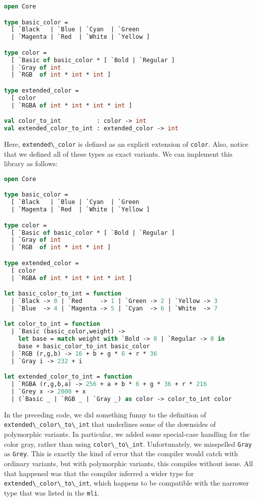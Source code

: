 \begin{lstlisting}[language=Caml]
open Core

type basic_color =
  [ `Black   | `Blue | `Cyan  | `Green
  | `Magenta | `Red  | `White | `Yellow ]

type color =
  [ `Basic of basic_color * [ `Bold | `Regular ]
  | `Gray of int
  | `RGB  of int * int * int ]

type extended_color =
  [ color
  | `RGBA of int * int * int * int ]

val color_to_int          : color -> int
val extended_color_to_int : extended_color -> int
\end{lstlisting}

Here, \passthrough{\lstinline!extended\_color!} is defined as an
explicit extension of \passthrough{\lstinline!color!}. Also, notice that
we defined all of these types as exact variants. We can implement this
library as follows:

\begin{lstlisting}[language=Caml]
open Core

type basic_color =
  [ `Black   | `Blue | `Cyan  | `Green
  | `Magenta | `Red  | `White | `Yellow ]

type color =
  [ `Basic of basic_color * [ `Bold | `Regular ]
  | `Gray of int
  | `RGB  of int * int * int ]

type extended_color =
  [ color
  | `RGBA of int * int * int * int ]

let basic_color_to_int = function
  | `Black -> 0 | `Red     -> 1 | `Green -> 2 | `Yellow -> 3
  | `Blue  -> 4 | `Magenta -> 5 | `Cyan  -> 6 | `White  -> 7

let color_to_int = function
  | `Basic (basic_color,weight) ->
    let base = match weight with `Bold -> 8 | `Regular -> 0 in
    base + basic_color_to_int basic_color
  | `RGB (r,g,b) -> 16 + b + g * 6 + r * 36
  | `Gray i -> 232 + i

let extended_color_to_int = function
  | `RGBA (r,g,b,a) -> 256 + a + b * 6 + g * 36 + r * 216
  | `Grey x -> 2000 + x
  | (`Basic _ | `RGB _ | `Gray _) as color -> color_to_int color
\end{lstlisting}

In the preceding code, we did something funny to the definition of
\passthrough{\lstinline!extended\_color\_to\_int!} that underlines some
of the downsides of polymorphic variants. In particular, we added some
special-case handling for the color gray, rather than using
\passthrough{\lstinline!color\_to\_int!}. Unfortunately, we misspelled
\passthrough{\lstinline!Gray!} as \passthrough{\lstinline!Grey!}. This
is exactly the kind of error that the compiler would catch with ordinary
variants, but with polymorphic variants, this compiles without issue.
All that happened was that the compiler inferred a wider type for
\passthrough{\lstinline!extended\_color\_to\_int!}, which happens to be
compatible with the narrower type that was listed in the
\passthrough{\lstinline!mli!}.

